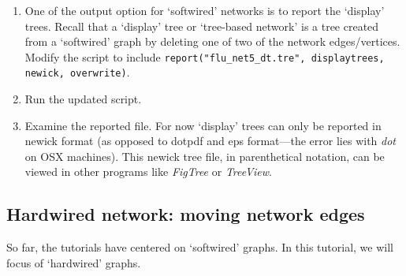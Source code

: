 \documentclass[11pt]{article}
\begin{document}
\begin {enumerate}
\item One of the output option for `softwired' networks is to report the `display' 
trees. Recall that a `display' tree or `tree-based network' is a tree created from 
a `softwired' graph by deleting one of two of the network edges/vertices. Modify 
the script to include \texttt{report("flu\_net5\_dt.tre", displaytrees, newick, 
overwrite)}.

\item Run the updated script.

\item Examine the reported file.  For now `display' trees can only be reported
in newick format (as opposed to dotpdf and eps format---the error lies with \textit{dot}
on OSX machines). This newick tree file, in parenthetical notation, can be viewed in 
other programs like \textit{FigTree} or \textit{TreeView}.

%
%

\end{enumerate}
\subsection{Hardwired network: moving network edges}
\label{subsec:hardnetmove}

So far, the tutorials have centered on `softwired' graphs. In this tutorial, we will 
focus of `hardwired' graphs.
\end{document}
